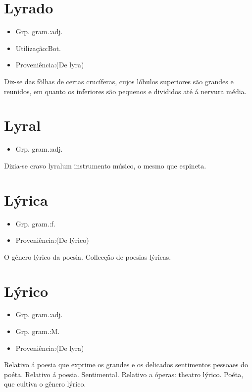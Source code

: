 \section{Lyrado}
\begin{itemize}
\item {Grp. gram.:adj.}
\end{itemize}
\begin{itemize}
\item {Utilização:Bot.}
\end{itemize}
\begin{itemize}
\item {Proveniência:(De \textunderscore lyra\textunderscore )}
\end{itemize}
Diz-se das fôlhas de certas crucíferas, cujos lóbulos superiores são grandes e reunidos, em quanto os inferiores são pequenos e divididos até á nervura média.
\section{Lyral}
\begin{itemize}
\item {Grp. gram.:adj.}
\end{itemize}
Dizia-se \textunderscore cravo lyral\textunderscore  um instrumento músico, o mesmo que \textunderscore espineta\textunderscore .
\section{Lýrica}
\begin{itemize}
\item {Grp. gram.:f.}
\end{itemize}
\begin{itemize}
\item {Proveniência:(De \textunderscore lýrico\textunderscore )}
\end{itemize}
O gênero lýrico da poesia.
Collecção de poesias lýricas.
\section{Lýrico}
\begin{itemize}
\item {Grp. gram.:adj.}
\end{itemize}
\begin{itemize}
\item {Grp. gram.:M.}
\end{itemize}
\begin{itemize}
\item {Proveniência:(De \textunderscore lyra\textunderscore )}
\end{itemize}
Relativo á poesia que exprime os grandes e os delicados sentimentos pessoaes do poéta.
Relativo á poesia.
Sentimental.
Relativo a óperas: \textunderscore theatro lýrico\textunderscore .
Poéta, que cultiva o gênero lýrico.
